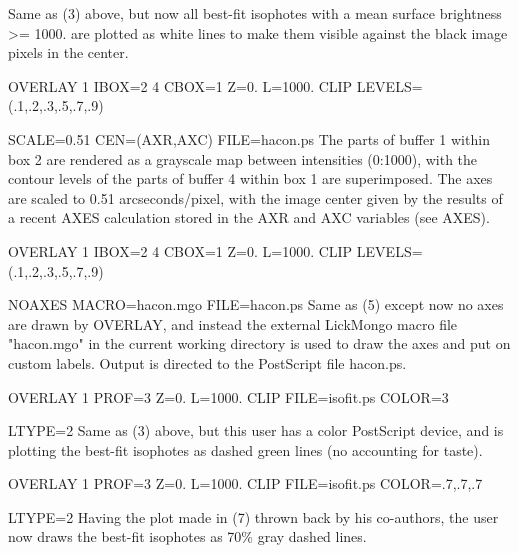 {\begin{example}
  \item[\hfill]{Same as (3) above, but now all best-fit isophotes with a mean
   surface brightness >= 1000. are plotted as white lines to make
   them visible against the black image pixels in the center.}
  \item[OVERLAY 1 IBOX=2 4 CBOX=1 Z=0. L=1000. 
        CLIP LEVELS=(.1,.2,.3,.5,.7,.9)\hfill]{}
  \item[SCALE=0.51 CEN=(AXR,AXC) FILE=hacon.ps\hfill]{
   The parts of buffer 1 within box 2 are rendered as a grayscale map
   between intensities (0:1000), with the contour levels of the parts
   of buffer 4 within box 1 are superimposed.  The axes are scaled to 0.51
   arcseconds/pixel, with the image center given by the results of a recent
   AXES calculation stored in the AXR and AXC variables (see AXES).}
  \item[OVERLAY 1 IBOX=2 4 CBOX=1 Z=0. L=1000. 
        CLIP LEVELS=(.1,.2,.3,.5,.7,.9)\hfill]{}
  \item[NOAXES MACRO=hacon.mgo FILE=hacon.ps\hfill]{
   Same as (5) except now no axes are drawn by OVERLAY, and instead the
   external LickMongo macro file "hacon.mgo" in the current working 
   directory is used to draw the axes and put on custom labels.  Output
   is directed to the PostScript file hacon.ps.}
  \item[OVERLAY 1 PROF=3 Z=0. L=1000. CLIP FILE=isofit.ps COLOR=3\hfill]{}
  \item[LTYPE=2\hfill]{
   Same as (3) above, but this user has a color PostScript device, and
   is plotting the best-fit isophotes as dashed green lines (no accounting
   for taste).  }
  \item[OVERLAY 1 PROF=3 Z=0. L=1000. CLIP FILE=isofit.ps 
        COLOR=.7,.7,.7\hfill]{} 
  \item[LTYPE=2\hfill]{
   Having the plot made in (7) thrown back by his co-authors, the user
   now draws the best-fit isophotes as 70\% gray dashed lines.}
\end{example}%
\lthtmlfigureZ
\lthtmlcheckvsize\clearpage}


